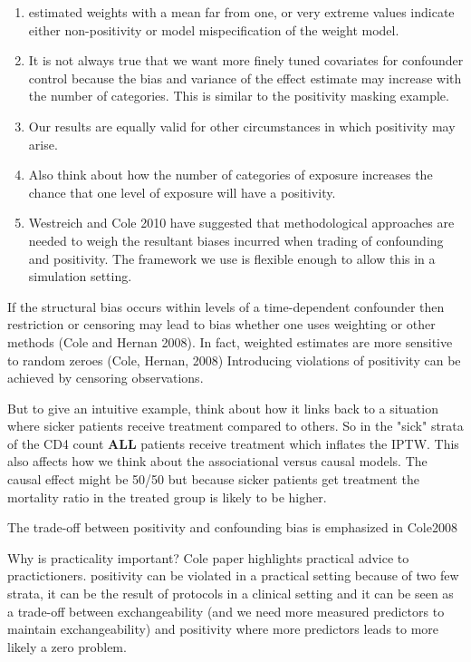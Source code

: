 \documentclass[11pt]{article}
\providecommand{\tightlist}{%
      \setlength{\itemsep}{0pt}\setlength{\parskip}{0pt}}
\begin{document}
\begin{enumerate}
\def\labelenumi{\arabic{enumi}.}
\setcounter{enumi}{5}
\tightlist
\item
  estimated weights with a mean far from one, or very extreme values
  indicate either non-positivity or model mispecification of the weight
  model.
\item
  It is not always true that we want more finely tuned covariates for
  confounder control because the bias and variance of the effect
  estimate may increase with the number of categories. This is similar
  to the positivity masking example.
\item
  Our results are equally valid for other circumstances in which
  positivity may arise.
\item
  Also think about how the number of categories of exposure increases
  the chance that one level of exposure will have a positivity.
\item
  Westreich and Cole 2010 have suggested that methodological approaches
  are needed to weigh the resultant biases incurred when trading of
  confounding and positivity. The framework we use is flexible enough to
  allow this in a simulation setting.
\end{enumerate}

If the structural bias occurs within levels of a time-dependent
confounder then restriction or censoring may lead to bias whether one
uses weighting or other methods (Cole and Hernan 2008). In fact,
weighted estimates are more sensitive to random zeroes (Cole, Hernan,
2008) Introducing violations of positivity can be achieved by censoring
observations.

But to give an intuitive example, think about how it links back to a
situation where sicker patients receive treatment compared to others. So
in the "sick" strata of the CD4 count \textbf{ALL} patients receive
treatment which inflates the IPTW. This also affects how we think about
the associational versus causal models. The causal effect might be 50/50
but because sicker patients get treatment the mortality ratio in the
treated group is likely to be higher.

The trade-off between positivity and confounding bias is emphasized in
Cole2008

Why is practicality important? Cole paper highlights practical advice to
practictioners. positivity can be violated in a practical setting
because of two few strata, it can be the result of protocols in a
clinical setting and it can be seen as a trade-off between
exchangeability (and we need more measured predictors to maintain
exchangeability) and positivity where more predictors leads to more
likely a zero problem.
\end{document}
